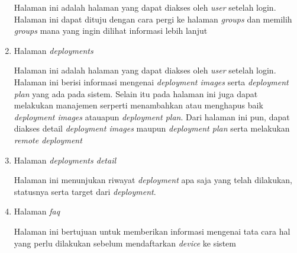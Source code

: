 \begin{enumerate}
        Halaman ini adalah halaman yang dapat diakses oleh \textit{user} setelah login. Halaman ini dapat dituju dengan cara pergi ke halaman \textit{groups} dan memilih \textit{groups} mana yang ingin dilihat informasi lebih lanjut


  \item Halaman \textit{deployments}

        Halaman ini adalah halaman yang dapat diakses oleh \textit{user} setelah login. Halaman ini berisi informasi mengenai \textit{deployment images} serta \textit{deployment plan} yang ada pada sistem. Selain itu pada halaman ini juga dapat melakukan manajemen serperti menambahkan atau menghapus baik \textit{deployment images} atauapun \textit{deployment plan}. Dari halaman ini pun, dapat diakses detail \textit{deployment images} maupun \textit{deployment plan} serta melakukan \textit{remote deployment}

  \item Halaman \textit{deployments detail}

        Halaman ini menunjukan riwayat \textit{deployment} apa saja yang telah dilakukan, statusnya serta target dari \textit{deployment}.

  \item Halaman \textit{faq}

        Halaman ini bertujuan untuk memberikan informasi mengenai tata cara hal yang perlu dilakukan sebelum mendaftarkan \textit{device} ke sistem


\end{enumerate}